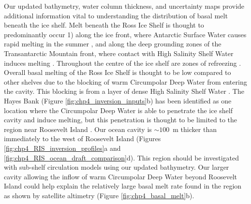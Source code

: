 Our updated bathymetry, water column thickness, and uncertainty maps provide additional information vital to understanding the distribution of basal melt beneath the ice shelf. Melt beneath the Ross Ice Shelf is thought to predominantly occur 1) along the ice front, where Antarctic Surface Water causes rapid melting in the summer \citep[Figure \ref{fig:chp4_basal_melt}][]{horgansurface2011, moholdtbasal2014}, and along the deep grounding zones of the Transantarctic Mountain front, where contact with High Salinity Shelf Water induces melting \citep[Figure \ref{fig:chp4_basal_melt}b][]{tintoross2019, adusumilliinterannual2020}. Throughout the centre of the ice shelf are zones of refreezing \citep[Figure \ref{fig:chp4_basal_melt}][]{dasmulti2020, adusumilliinterannual2020}. Overall basal melting of the Ross Ice Shelf is thought to be low compared to other shelves due to the blocking of warm Circumpolar Deep Water from entering the cavity. This blocking is from a layer of dense High Salinity Shelf Water \citep{tintoross2019, dinnimanmodel2011}. The Hayes Bank (Figure \ref{fig:chp4_inversion_inputs}b) has been identified  as one location where the Circumpolar Deep Water is able to penetrate the ice shelf cavity and induce melting, but this penetration is thought to be limited to the region near Roosevelt Island \citep{tintoross2019, dasmulti2020}. Our ocean cavity is $\sim100$~m thicker than \citet{tintoross2019} immediately to the west of Roosevelt Island (Figures \ref{fig:chp4_RIS_inversion_profiles}a and \ref{fig:chp4_RIS_ocean_draft_comparison}d). This region should be investigated with sub-shelf circulation models using our updated bathymetry. Our larger cavity allowing the inflow of warm Circumpolar Deep Water beyond Roosevelt Island could help explain the relatively large basal melt rate found in the region as shown by satellite altimetry (Figure \ref{fig:chp4_basal_melt}b).\\

